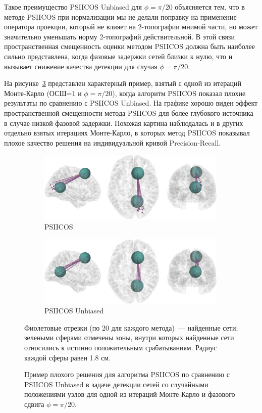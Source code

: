 Такое преимущество PSIICOS Unbiased для $\phi=\pi/20$ объясняется тем, что в методе
PSIICOS при нормализации мы не делали поправку на применение оператора проекции, который
не влияет на 2-топографии мнимой части, но может значительно уменьшать норму 2-топографий
действительной. В этой связи пространственная смещенность оценки методом PSIICOS должна
быть наиболее сильно представлена, когда фазовые задержки сетей близки к нулю, что и вызывает
снижение качества детекции для случая $\phi=\pi/20$.

На рисунке~\ref{fig:psiicos_vs_unbiased_case_3dbrain} представлен характерный пример, взятый с одной из итераций Монте-Карло (ОСШ=1 и $\phi=\pi/20$),
когда алгоритм PSIICOS показал плохие результаты
по сравнению с PSIICOS Unbiased. На графике хорошо виден эффект пространственной смещенности
метода PSIICOS для более глубокого источника в случае низкой фазовой задержки.
Похожая картина наблюдалась и в других отдельно взятых итерациях Монте-Карло, в которых
метод PSIICOS показывал плохое качество решения на индивидуальной кривой Precision-Recall.

\begin{figure}[htbp]
    \begin{subfigure}[t]{0.5\textwidth}
        \includegraphics[width=0.99\textwidth]{../images/bias_brain_PSIICOS.jpg}
        \caption{PSIICOS}\label{fig:bias_brain_psiicos}
    \end{subfigure}
    \begin{subfigure}[t]{0.5\textwidth}
        \includegraphics[width=0.99\textwidth]{../images/bias_brain_PSIICOS_Unbiased.jpg}
        \caption{PSIICOS Unbiased}\label{fig:bias_brain_psiicos_unbiased}
    \end{subfigure}
    \caption{Пример плохого решения для алгоритма PSIICOS по сравнению с
        PSIICOS Unbiased в задаче детекции сетей со случайными положениями
        узлов для одной из итераций Монте-Карло и фазового сдвига
        $\phi=\pi/20$.
    }\label{fig:psiicos_vs_unbiased_case_3dbrain}
    Фиолетовые отрезки (по 20 для каждого метода)~--- найденные сети; зелеными
    сферами отмечены зоны, внутри которых найденные сети относились к истинно
    положительным срабатываниям. Радиус каждой сферы равен 1.8 см.
\end{figure}

